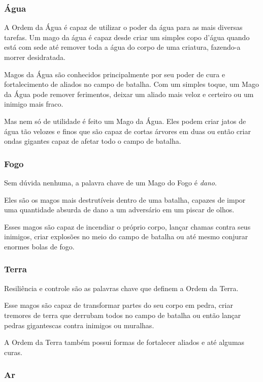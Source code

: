 \documentclass{RPG_Adventure}[2021/10/20]
\begin{document}
\subsubsection{Água}%
\label{ssub:agua}

A Ordem da Água é capaz de utilizar o poder da água para as mais diversas
tarefas. Um mago da água é capaz desde criar um simples copo d'água quando está
com sede até remover toda a água do corpo de uma criatura, fazendo-a morrer
desidratada.

Magos da Água são conhecidos principalmente por seu poder de cura e
fortalecimento de aliados no campo de batalha. Com um simples toque, um Mago da
Água pode remover ferimentos, deixar um aliado mais veloz e certeiro ou um
inimigo mais fraco.

Mas nem só de utilidade é feito um Mago da Água. Eles podem criar jatos de água
tão velozes e finos que são capaz de cortas árvores em duas ou então criar ondas
gigantes capaz de afetar todo o campo de batalha.

\subsubsection*{Fogo}%
\label{ssub:fogo}

Sem dúvida nenhuma, a palavra chave de um Mago do Fogo é \textit{dano}.

Eles são os magos mais destrutíveis dentro de uma batalha, capazes de impor uma
quantidade absurda de dano a um adversário em um piscar de olhos.

Esses magos são capaz de incendiar o próprio corpo, lançar chamas contra seus
inimigos, criar explosões no meio do campo de batalha ou até mesmo conjurar
enormes bolas de fogo.

\subsubsection*{Terra}%
\label{ssub:terra}

Resiliência e controle são as palavras chave que definem a Ordem da Terra.

Esse magos são capaz de transformar partes do seu corpo em pedra, criar tremores
de terra que derrubam todos no campo de batalha ou então lançar pedras
gigantescas contra inimigos ou muralhas.

A Ordem da Terra também possui formas de fortalecer aliados e até algumas curas.

\subsubsection*{Ar}%
\label{ssub:ar}
\end{document}
